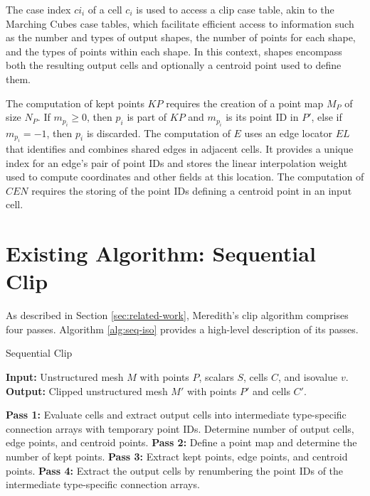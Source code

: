 \documentclass{egpubl}
\begin{document}
The case index $ci_i$ of a cell $c_i$ is used to access a clip case table, akin to the Marching Cubes case tables, which facilitate efficient access to information such as the number and types of output shapes, the number of points for each shape, and the types of points within each shape. In this context, shapes encompass both the resulting output cells and optionally a centroid point used to define them.

The computation of kept points $KP$ requires the creation of a point map $M_P$ of size $N_P$. If $m_{p_i} \geq 0$, then $p_i$ is part of $KP$ and $m_{p_i}$ is its point ID in $P'$, else if $m_{p_i} = -1$, then $p_i$ is discarded.  The computation of $E$ uses an edge locator $EL$ that identifies and combines shared edges in adjacent cells. It provides a unique index for an edge's pair of point IDs and stores the linear interpolation weight used to compute coordinates and other fields at this location. The computation of $CEN$ requires the storing of the point IDs defining a centroid point in an input cell.

\section{Existing Algorithm: Sequential Clip}
\label{sec:sequential-clip-algorithm}

As described in Section \ref{sec:related-work}, Meredith's clip algorithm comprises four passes. Algorithm \ref{alg:seq-iso} provides a high-level description of its passes.

\begin{algorithm}
\caption{Sequential Clip}
\label{alg:seq-iso}
\raggedright
\textbf{Input:} Unstructured mesh $M$ with points $P$, scalars $S$, cells $C$, and isovalue $v$.\\
\textbf{Output:} Clipped unstructured mesh $M'$ with points $P'$ and cells $C'$.
\begin{algorithmic}[1]
    \State \textbf{Pass 1:} Evaluate cells and extract output cells into intermediate type-specific connection arrays with temporary point IDs. Determine number of output cells, edge points, and centroid points.
    \State \textbf{Pass 2:} Define a point map and determine the number of kept points.
    \State \textbf{Pass 3:} Extract kept points, edge points, and centroid points.
    \State \textbf{Pass 4:} Extract the output cells by renumbering the point IDs of the intermediate type-specific connection arrays.
\end{algorithmic}
\end{algorithm}
\end{document}
